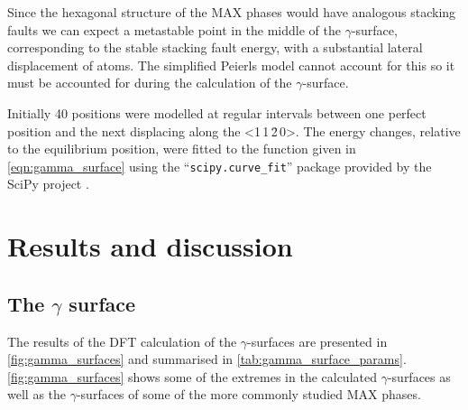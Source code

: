 Since the hexagonal structure of the MAX phases would have analogous stacking faults we can expect a metastable point in the middle of the $\gamma$-surface, corresponding to the stable stacking fault energy, with a substantial lateral displacement of atoms. The simplified Peierls model cannot account for this so it must be accounted for during the calculation of the $\gamma$-surface.

Initially 40 positions were modelled at regular intervals between one perfect position and the next displacing along the <1\,1\,\={2}\,0>. The energy changes, relative to the equilibrium position, were fitted to the function given in \autoref{eqn:gamma_surface} using the ``\texttt{scipy.curve\_fit}'' package provided by the SciPy project \cite{SciPy2001}.





\section{Results and discussion}

\subsection{The \texorpdfstring{$\gamma$}{gamma} surface}
The results of the DFT calculation of the $\gamma$-surfaces are presented in \autoref{fig:gamma_surfaces} and summarised in \autoref{tab:gamma_surface_params}. \autoref{fig:gamma_surfaces} shows some of the extremes in the calculated $\gamma$-surfaces as well as the $\gamma$-surfaces of some of the more commonly studied MAX phases. 


